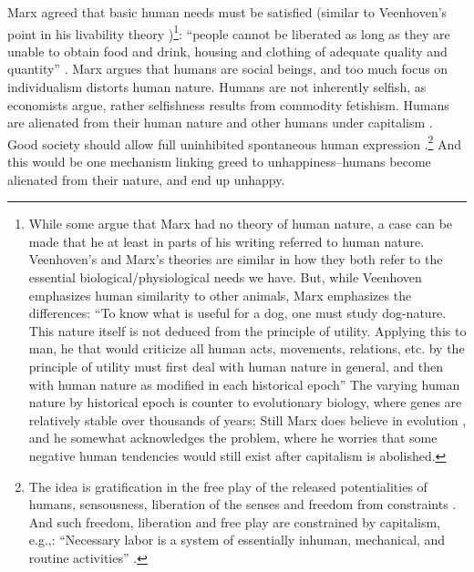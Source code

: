 \documentclass[10pt, letterpaper]{article}
\begin{document}
\begin{spacing}{1.8}
Marx agreed that basic human needs must be satisfied (similar to Veenhoven's
point in his livability theory \citep{veenhoven14b})\footnote{While some
  argue that Marx had no theory of human nature, a case can be made that he at least in parts of his writing referred to human nature. 
%
  Veenhoven's and Marx's theories are similar in how they both refer to the essential biological/physiological needs we have. But, while Veenhoven emphasizes human similarity to other animals, Marx
emphasizes the differences: ``To know what is useful for a dog, one must study dog-nature. This nature
itself is not deduced from the principle of utility. Applying this to man, he that would criticize all human acts, movements, relations, etc. by the principle
of utility must first deal with human nature in general, and then with human nature as modified in each historical epoch''\citep[quoted in][p. 83]{struhl16}
The varying human nature by historical epoch is counter to evolutionary biology, where genes are relatively
stable over thousands of years; Still Marx does believe in  evolution \citep{heyer82},
and he somewhat acknowledges the problem, where he
worries that some negative human tendencies would still exist after capitalism is abolished.}: ``people cannot be
liberated as long as they are unable to obtain food and drink, housing and clothing of adequate quality and quantity'' \citep[cited in][p. 70]{geras83}.
Marx argues that humans are social beings, and too much focus on individualism distorts human nature.%
Humans are not inherently selfish, as economists argue, rather selfishness results from commodity fetishism. %
Humans are alienated from their human nature and other humans under capitalism \citep{byron16}. %
Good society should allow full uninhibited spontaneous human expression %
\citep{marcuse15}.\footnote{The idea is gratification in the free play of the
  released potentialities of humans, sensousness, liberation of the senses and
  freedom from constraints \citep{marcuse15}. And such freedom, liberation and
  free play are constrained by capitalism, e.g.,: ``Necessary labor is a system of
  essentially inhuman, mechanical, and routine activities''
  \citep[][p. 195]{marcuse15}.} 
%
And this would be one mechanism linking greed  to unhappiness--humans become alienated from their nature, and end up unhappy. 


\end{spacing}
\end{document}
